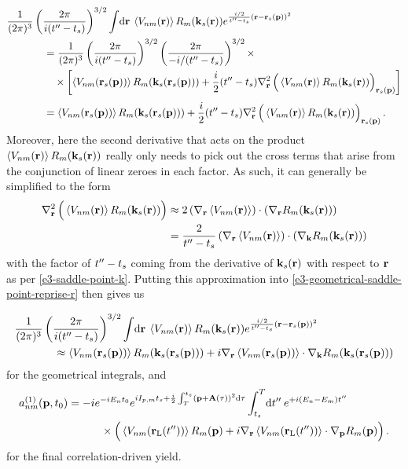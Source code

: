 \begin{align}
\frac{1}{(2\pi)^{3}}
&
\left(
 \frac{2\pi}{i(t''-\ts)}
 \right)^{3/2}
\int\!\d\vbr \:
\Vnm{\vbr}
R_m(\vbk_s(\vbr))
e^{\frac{i/2}{t''-\ts} (\vbr-\vbr_s(\vbp))^2}
%
\nonumber \\ & \quad =
%
\frac{1}{(2\pi)^{3}}
\left(
 \frac{2\pi}{i(t''-\ts)}
 \right)^{3/2}
\left(
 \frac{2\pi}{-i/(t''-\ts)}
 \right)^{3/2}
\times
%
\nonumber \\ & \quad \quad \times
%
\left[
 \Vnm{\vbr_s(\vbp)}
 R_m(\vbk_s(\vbr_s(\vbp)))
 +
 \frac{i}{2} (t''-\ts)
 \nabla_{\vbr}^2
 \left(
   \vphantom{\sum}
   \Vnm{\vbr}
   R_m(\vbk_s(\vbr))
 \right)_{\vbr_s(\vbp)}
\right]
%
\nonumber \\[3pt] & \quad =
%
\Vnm{\vbr_s(\vbp)}
R_m(\vbk_s(\vbr_s(\vbp)))
 +
 \frac{i}{2} (t''-\ts)
 \nabla_{\vbr}^2
 \left(
   \vphantom{\sum}
   \Vnm{\vbr}
   R_m(\vbk_s(\vbr))
 \right)_{\vbr_s(\vbp)}
.
\label{e3-geometrical-saddle-point-reprise-r}
\end{align}
%
%
Moreover, here the second derivative that acts on the product $\left\langle V_{nm}\mathopen{}\left( \vb{r} \right)\mathclose{} \right\rangle R_m(\vb{k}_s(\vb{r}))$ really only needs to pick out the cross terms that arise from the conjunction of linear zeroes in each factor. As such, it can generally be simplified to the form
\begin{align}
\nabla_{\vbr}^2
\left(
  \vphantom{\sum}
  \Vnm{\vbr}
  R_m(\vbk_s(\vbr))
\right)
%
& \approx
%
2 \left( \nabla_{\vbr}\Vnm{\vbr} \right)
\cdot
\left( \nabla_{\vbr} R_m(\vbk_s(\vbr)) \right)
%
\nonumber \\ & =
%
\frac{2}{t''-\ts} 
\left( \nabla_{\vbr}\Vnm{\vbr} \right)
\cdot
\left( \nabla_{\vbk} R_m(\vbk_s(\vbr)) \right)
\end{align}
with the factor of $t''-{t_s}$ coming from the derivative of $\vb{k}_s(\vb{r})$ with respect to $\vb{r}$ as per \eqref{e3-saddle-point-k}. Putting this approximation into \eqref{e3-geometrical-saddle-point-reprise-r} then gives us


\begin{align}
\frac{1}{(2\pi)^{3}}
&
\left(
 \frac{2\pi}{i(t''-\ts)}
 \right)^{3/2}
\int\!\d\vbr \:
\Vnm{\vbr}
R_m(\vbk_s(\vbr))
e^{\frac{i/2}{t''-\ts} (\vbr-\vbr_s(\vbp))^2}
%
\nonumber \\ & \quad \approx
%
\Vnm{\vbr_s(\vbp)}
R_m(\vbk_s(\vbr_s(\vbp)))
+
i
\nabla_{\vbr}\Vnm{\vbr_s(\vbp)}
\cdot
\nabla_{\vbk} R_m(\vbk_s(\vbr_s(\vbp))) 
\label{e3-geometrical-saddle-point-with-explicit-grad-dot-grad}
\end{align}
for the geometrical integrals, and 
\begin{align}
a_{nm}^{(1)}(\vb{p},{t_0})
& =
-i
e^{-iE_n {t_0}}
e^{iI_{p,m} {t_s}+\frac{i}{2} \int_T^{{t_s}}\left(\vb{p}+\vb{A}(\tau)\right)^2\mathrm{d}\tau} 
\int_{{t_s}}^T\!\mathrm{d} t''\:
e^{+i(E_n-E_m)t''}
\nonumber \\ & \qquad \quad \times
\left(
\vphantom{\sum}
\left\langle V_{nm}\mathopen{}\left( \vb{r}_\mathrm{L}(t'') \right)\mathclose{} \right\rangle
R_m(\vb{p})
+
i
\nabla_{\vb{r}}\left\langle V_{nm}\mathopen{}\left( \vb{r}_\mathrm{L}(t'') \right)\mathclose{} \right\rangle
\cdot
\nabla_{\vb{p}} R_m(\vb{p}) 
\right)
.
\label{e3-correlation-driven-yield-reprise-with-full-derivatives}
\end{align}
for the final correlation-driven yield.

